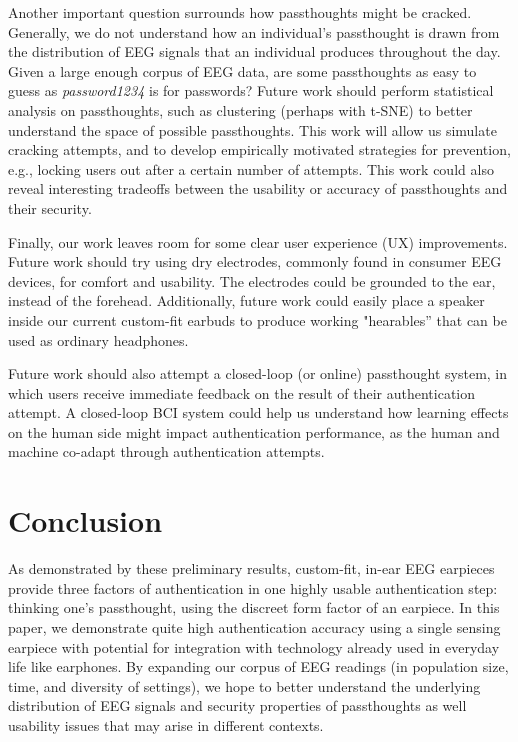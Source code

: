 \documentclass{sigchi}
\begin{document}
Another important question surrounds how passthoughts might be cracked. Generally, we do not understand how an individual's passthought is drawn from the distribution of EEG signals that an individual produces throughout the day. Given a large enough corpus of EEG data, are some passthoughts as easy to guess as \textit{password1234} is for passwords? Future work should perform statistical analysis on passthoughts, such as clustering (perhaps with t-SNE) to better understand the space of possible passthoughts. This work will allow us simulate cracking attempts, and to develop empirically motivated strategies for prevention, e.g., locking users out after a certain number of attempts. This work could also reveal interesting tradeoffs between the usability or accuracy of passthoughts and their security.

Finally, our work leaves room for some clear user experience (UX) improvements.
Future work should try using dry electrodes, commonly found in consumer EEG devices, for comfort and usability. The electrodes could be grounded to the ear, instead of the forehead. Additionally, future work could easily place a speaker inside our current custom-fit earbuds to produce working "hearables'' that can be used as ordinary headphones.

Future work should also attempt a closed-loop (or online) passthought system, in which users receive immediate feedback on the result of their authentication attempt. A closed-loop BCI system could help us understand how learning effects on the human side might impact authentication performance, as the human and machine co-adapt through authentication attempts.

\section{Conclusion}

As demonstrated by these preliminary results, custom-fit, in-ear EEG earpieces provide three factors of authentication in one highly usable authentication step: thinking one's passthought, using the discreet form factor of an earpiece. In this paper, we demonstrate quite high authentication accuracy using a single sensing earpiece with potential for integration with technology already used in everyday life like earphones. By expanding our corpus of EEG readings (in population size, time, and diversity of settings), we hope to better understand the underlying distribution of EEG signals and security properties of passthoughts as well usability issues that may arise in different contexts.
\end{document}

